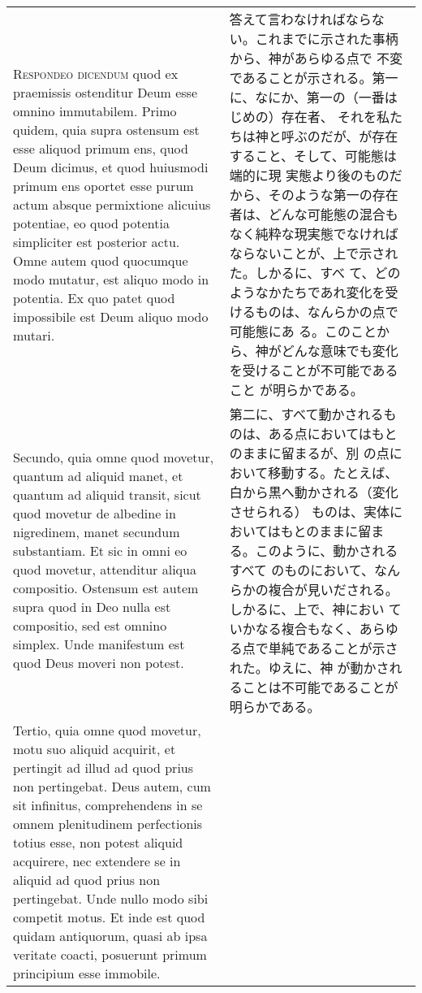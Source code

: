 \documentclass[10pt]{jsarticle} %
\begin{document}
\begin{longtable}{p{21em}p{21em}}
{\scshape Respondeo dicendum} quod ex praemissis ostenditur Deum esse
 omnino immutabilem. Primo quidem, quia supra ostensum est esse aliquod
 primum ens, quod Deum dicimus, et quod huiusmodi primum ens oportet
 esse purum actum absque permixtione alicuius potentiae, eo quod
 potentia simpliciter est posterior actu. Omne autem quod quocumque modo
 mutatur, est aliquo modo in potentia. Ex quo patet quod impossibile est
 Deum aliquo modo mutari. 


&

答えて言わなければならない。これまでに示された事柄から、神があらゆる点で
 不変であることが示される。第一に、なにか、第一の（一番はじめの）存在者、
 それを私たちは神と呼ぶのだが、が存在すること、そして、可能態は端的に現
 実態より後のものだから、そのような第一の存在者は、どんな可能態の混合も
 なく純粋な現実態でなければならないことが、上で示された。しかるに、すべ
 て、どのようなかたちであれ変化を受けるものは、なんらかの点で可能態にあ
 る。このことから、神がどんな意味でも変化を受けることが不可能であること
 が明らかである。

\\


Secundo, quia omne quod movetur, quantum ad aliquid manet, et quantum ad
 aliquid transit, sicut quod movetur de albedine in nigredinem, manet
 secundum substantiam. Et sic in omni eo quod movetur, attenditur aliqua
 compositio. Ostensum est autem supra quod in Deo nulla est compositio,
 sed est omnino simplex. Unde manifestum est quod Deus moveri non
 potest.


&

第二に、すべて動かされるものは、ある点においてはもとのままに留まるが、別
 の点において移動する。たとえば、白から黒へ動かされる（変化させられる）
 ものは、実体においてはもとのままに留まる。このように、動かされるすべて
 のものにおいて、なんらかの複合が見いだされる。しかるに、上で、神におい
 ていかなる複合もなく、あらゆる点で単純であることが示された。ゆえに、神
 が動かされることは不可能であることが明らかである。


\\

Tertio, quia omne quod movetur, motu suo aliquid acquirit, et pertingit
 ad illud ad quod prius non pertingebat. Deus autem, cum sit infinitus,
 comprehendens in se omnem plenitudinem perfectionis totius esse, non
 potest aliquid acquirere, nec extendere se in aliquid ad quod prius non
 pertingebat. Unde nullo modo sibi competit motus. Et inde est quod
 quidam antiquorum, quasi ab ipsa veritate coacti, posuerunt primum
 principium esse immobile.



\end{longtable}
\end{document}
